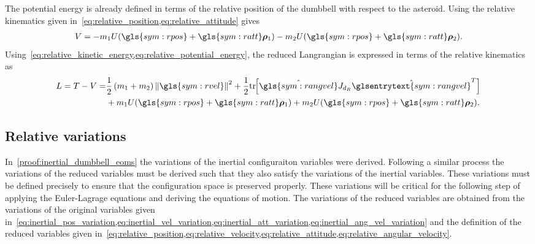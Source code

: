 The potential energy is already defined in terms of the relative position of the dumbbell with respect to the asteroid.
Using the relative kinematics given in~\cref{eq:relative_position,eq:relative_attitude} gives
\begin{align}\label{eq:relative_potential_energy}
    V = -m_1 U( \gls{sym:rpos} + \gls{sym:ratt} \vc{\rho}_1) - m_2 U(\gls{sym:rpos} + \gls{sym:ratt} \vc{\rho}_2).
\end{align}
Using~\cref{eq:relative_kinetic_energy,eq:relative_potential_energy}, the reduced Langrangian is expressed in terms of the relative kinematics as 
\begin{align}\label{eq:relative_lagrangian}
    L = T-V =& \frac{1}{2} \parenth{m_1 + m_2} \norm{\gls{sym:rvel}}^2 + \frac{1}{2} \tr{\hat{\gls{sym:rangvel}} J_{d_R} \hat{\glsentrytext{sym:rangvel}}^T} \nonumber \\
             &+m_1 U(\gls{sym:rpos} + \gls{sym:ratt} \vc{\rho}_1) + m_2 U(\gls{sym:rpos} + \gls{sym:ratt} \vc{\rho}_2) .
\end{align}

\subsection{Relative variations}\label{ssec:relative_variations}
In~\cref{proof:inertial_dumbbell_eoms} the variations of the inertial configuraiton variables were derived.
Following a similar process the variations of the reduced variables must be derived such that they also satisfy the variations of the inertial variables.
These variations must be defined precisely to ensure that the configuration space is preserved properly. 
These variations will be critical for the following step of applying the Euler-Lagrage equations and deriving the equations of motion.
The variations of the reduced variables are obtained from the variations of the original variables given in~\cref{eq:inertial_pos_variation,eq:inertial_vel_variation,eq:inertial_att_variation,eq:inertial_ang_vel_variation} and the definition of the reduced variables given in~\cref{eq:relative_position,eq:relative_velocity,eq:relative_attitude,eq:relative_angular_velocity}.

